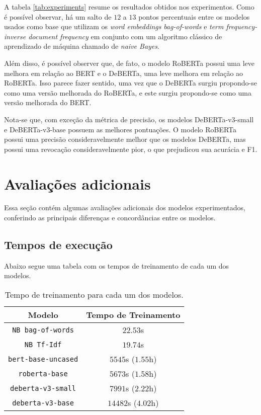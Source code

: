 A tabela \ref{tab:experiments} resume os resultados obtidos nos experimentos.
Como é possível observar, há um salto de $12$ a $13$ pontos percentuais entre os
modelos usados como base que utilizam os \textit{word embeddings}
\textit{bag-of-words} e \textit{term frequency-inverse document frequency} em
conjunto com um algoritmo clássico de aprendizado de máquina chamado de
\textit{naive Bayes}.

Além disso, é possível observer que, de fato, o modelo RoBERTa possui uma leve
melhora em relação ao BERT e o DeBERTa, uma leve melhora em relação ao RoBERTa.
Isso parece fazer sentido, uma vez que o DeBERTa surgiu propondo-se como uma
versão melhorada do RoBERTa, e este surgiu propondo-se como uma versão melhorada
do BERT.

Nota-se que, com exceção da métrica de precisão, os modelos DeBERTa-v3-small e
DeBERTa-v3-base possuem as melhores pontuações. O modelo RoBERTa possui uma
precisão consideravelmente melhor que os modelos DeBERTa, mas possui uma
revocação consideravelmente pior, o que prejudicou sua acurácia e F1.


\section{Avaliações adicionais}%
\label{sec:avaliacoes_adicionais}

Essa seção contém algumas avaliações adicionais dos modelos experimentados,
conferindo as principais diferenças e concordâncias entre os modelos.

\subsection{Tempos de execução}%
\label{sub:tempos_de_execucao}

Abaixo segue uma tabela com os tempos de treinamento de cada um dos modelos.

\begin{table}[h]
\centering
\caption{Tempo de treinamento para cada um dos modelos.}
\label{tab:experiments_times}
\begin{tabular}{c | c }
   \textbf{Modelo} & \textbf{Tempo de Treinamento} \\ \hline \hline
   \texttt{NB bag-of-words} & $22.53$s \\
   \texttt{NB Tf-Idf} & $19.74$s \\ \hline
   \texttt{bert-base-uncased} & $5545$s ($1.55$h) \\
   \texttt{roberta-base} & $5673$s ($1.58$h) \\
   \texttt{deberta-v3-small} & $7991$s ($2.22$h) \\
   \texttt{deberta-v3-base} & $14482$s ($4.02$h) \\ \hline
\end{tabular}
\end{table}

